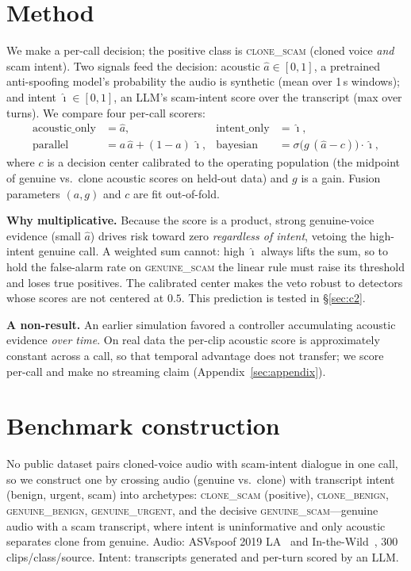 \documentclass[11pt]{article}
\begin{document}
\section{Method}
We make a per-call decision; the positive class is \textsc{clone\_scam} (cloned voice
\emph{and} scam intent). Two signals feed the decision: acoustic $\hat{a}\in[0,1]$, a
pretrained anti-spoofing model's probability the audio is synthetic (mean over 1\,s
windows); and intent $\hat{\imath}\in[0,1]$, an LLM's scam-intent score over the transcript
(max over turns). We compare four per-call scorers:
\begin{align*}
\text{acoustic\_only} &= \hat{a}, &\text{intent\_only} &= \hat{\imath}, \\
\text{parallel} &= a\,\hat{a} + (1-a)\,\hat{\imath}, &
\text{bayesian} &= \sigma\!\big(g\,(\hat{a}-c)\big)\cdot\hat{\imath},
\end{align*}
where $c$ is a decision center calibrated to the operating population (the midpoint of
genuine vs.\ clone acoustic scores on held-out data) and $g$ is a gain. Fusion parameters
$(a,g)$ and $c$ are fit out-of-fold.

\textbf{Why multiplicative.} Because the score is a product, strong genuine-voice evidence
(small $\hat{a}$) drives risk toward zero \emph{regardless of intent}, vetoing the
high-intent genuine call. A weighted sum cannot: high $\hat{\imath}$ always lifts the sum,
so to hold the false-alarm rate on \textsc{genuine\_scam} the linear rule must raise its
threshold and loses true positives. The calibrated center makes the veto robust to
detectors whose scores are not centered at $0.5$. This prediction is tested in
\S\ref{sec:c2}.

\textbf{A non-result.} An earlier simulation favored a controller accumulating acoustic
evidence \emph{over time}. On real data the per-clip acoustic score is approximately
constant across a call, so that temporal advantage does not transfer; we score per-call and
make no streaming claim (Appendix~\ref{sec:appendix}).

\section{Benchmark construction}
No public dataset pairs cloned-voice audio with scam-intent dialogue in one call, so we
construct one by crossing audio (genuine vs.\ clone) with transcript intent (benign, urgent,
scam) into archetypes: \textsc{clone\_scam} (positive), \textsc{clone\_benign},
\textsc{genuine\_benign}, \textsc{genuine\_urgent}, and the decisive
\textsc{genuine\_scam}---genuine audio with a scam transcript, where intent is uninformative
and only acoustic separates clone from genuine. Audio: ASVspoof 2019
LA~\cite{asvspoof2019} and In-the-Wild~\cite{inthewild}, 300 clips/class/source. Intent:
transcripts generated and per-turn scored by an LLM.
\end{document}
